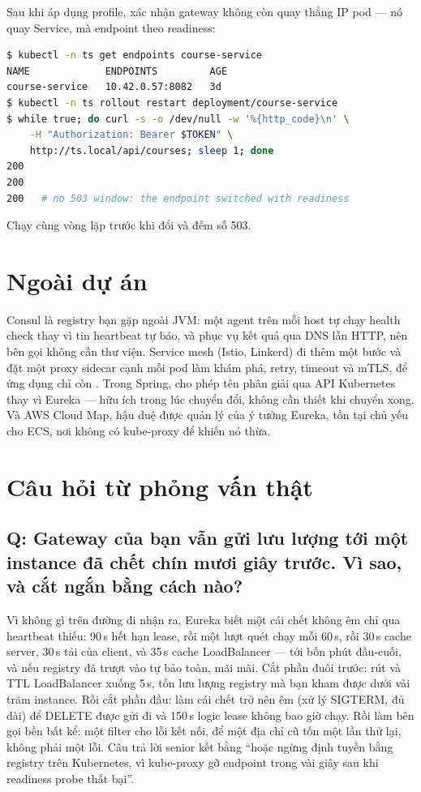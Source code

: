 \begin{handson}
Sau khi áp dụng profile, xác nhận gateway không còn quay thẳng IP pod
--- nó quay Service, mà endpoint theo readiness:
\begin{lstlisting}[language=bash]
$ kubectl -n ts get endpoints course-service
NAME             ENDPOINTS         AGE
course-service   10.42.0.57:8082   3d
$ kubectl -n ts rollout restart deployment/course-service
$ while true; do curl -s -o /dev/null -w '%{http_code}\n' \
    -H "Authorization: Bearer $TOKEN" \
    http://ts.local/api/courses; sleep 1; done
200
200
200   # no 503 window: the endpoint switched with readiness
\end{lstlisting}
Chạy cùng vòng lặp trước khi đổi và đếm số 503.
\end{handson}

\section{Ngoài dự án}

Consul là registry bạn gặp ngoài JVM: một agent trên mỗi host tự chạy
health check thay vì tin heartbeat tự báo, và phục vụ kết quả qua DNS
lẫn HTTP, nên bên gọi không cần thư viện. Service mesh (Istio, Linkerd)
đi thêm một bước và đặt một proxy sidecar cạnh mỗi pod làm khám phá,
retry, timeout và mTLS, để ứng dụng chỉ còn
. Trong Spring,
 cho phép tên  phân giải qua
API Kubernetes thay vì Eureka --- hữu ích trong lúc chuyển đổi, không
cần thiết khi chuyển xong. Và AWS Cloud Map, hậu duệ được quản lý của ý
tưởng Eureka, tồn tại chủ yếu cho ECS, nơi không có kube-proxy để khiến
nó thừa.

\section{Câu hỏi từ phỏng vấn thật}

\subsection*{Q: Gateway của bạn vẫn gửi lưu lượng tới một instance đã
chết chín mươi giây trước. Vì sao, và cắt ngắn bằng cách nào?}

Vì không gì trên đường đi nhận ra. Eureka biết một cái chết không êm
chỉ qua heartbeat thiếu: 90\,s hết hạn lease, rồi một lượt quét chạy
mỗi 60\,s, rồi 30\,s cache server, 30\,s tải của client, và 35\,s cache
LoadBalancer --- tới bốn phút đầu-cuối, và nếu registry đã trượt vào
tự bảo toàn, mãi mãi. Cắt phần đuôi trước: rút
 và TTL LoadBalancer xuống 5\,s,
tốn lưu lượng registry mà bạn kham được dưới vài trăm instance. Rồi
cắt phần đầu: làm cái chết trở nên êm (xử lý SIGTERM,
 đủ dài) để DELETE được gửi đi và
150\,s logic lease không bao giờ chạy. Rồi làm bên gọi bền bất kể: một
filter \code{Retry} cho lỗi kết nối, để một địa chỉ cũ tốn một lần thử
lại, không phải một lỗi. Câu trả lời senior kết bằng ``hoặc ngừng định
tuyến bằng registry trên Kubernetes, vì kube-proxy gỡ endpoint trong
vài giây sau khi readiness probe thất bại''.

